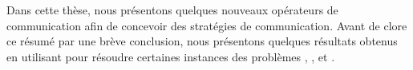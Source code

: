 Dans cette th\`ese, nous pr\'esentons quelques nouveaux op\'erateurs de communication afin de concevoir des strat\'egies de communication. Avant de clore ce résumé par une br\`eve conclusion, nous pr\'esentons quelques r\'esultats obtenus en utilisant \posl{} pour r\'esoudre certaines instances des probl\`emes {\it \sg}, {\it \carr}, \textit{\nq} et \textit{\gr}.
